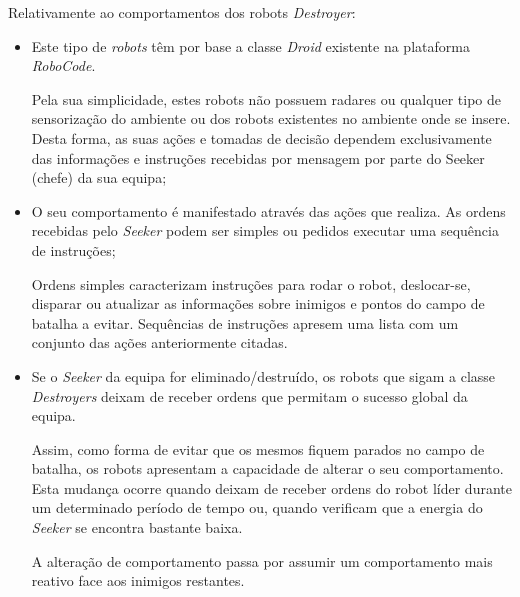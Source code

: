 Relativamente ao comportamentos dos robots \textit{Destroyer}:
\begin{itemize}
    \item Este tipo de \textit{robots} têm por base a classe \textit{Droid} existente na plataforma \textit{RoboCode}. 
    
    Pela sua simplicidade, estes robots não possuem radares ou qualquer tipo de sensorização do ambiente ou dos robots existentes no ambiente onde se insere.
    Desta forma, as suas ações e tomadas de decisão dependem exclusivamente das informações e instruções recebidas por mensagem por parte do Seeker (chefe) da sua equipa;
    
    \item O seu comportamento é manifestado através das ações que realiza. 
    As ordens recebidas pelo \textit{Seeker} podem ser simples ou pedidos executar uma sequência de instruções;
    
    Ordens simples caracterizam instruções para rodar o robot, deslocar-se, disparar ou atualizar as informações sobre inimigos e pontos do campo de batalha a evitar. 
    Sequências de instruções apresem uma lista com um conjunto das ações anteriormente citadas. 

    \item Se o \textit{Seeker} da equipa for eliminado/destruído, os robots que sigam a classe \textit{Destroyers} deixam de receber ordens que permitam o sucesso global da equipa. 
    
    Assim, como forma de evitar que os mesmos fiquem parados no campo de batalha, os robots apresentam a capacidade de alterar o seu comportamento. Esta mudança ocorre quando deixam de receber ordens do robot líder durante um determinado período de tempo ou, quando verificam que a energia do \textit{Seeker} se encontra bastante baixa. 
    
    A alteração de comportamento passa por assumir um comportamento mais reativo face aos inimigos restantes.
\end{itemize}

